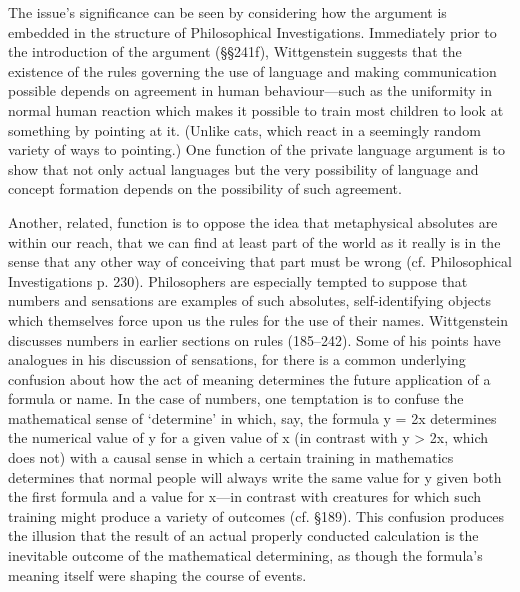   The issue's significance can be seen by considering how the argument is
  embedded in the structure of Philosophical Investigations. Immediately
  prior to the introduction of the argument (§§241f), Wittgenstein suggests
  that the existence of the rules governing the use of language and making
  communication possible depends on agreement in human behaviour—such as the
  uniformity in normal human reaction which makes it possible to train most
  children to look at something by pointing at it. (Unlike cats, which react
  in a seemingly random variety of ways to pointing.) One function of the
  private language argument is to show that not only actual languages but
  the very possibility of language and concept formation depends on the
  possibility of such agreement.

  Another, related, function is to oppose the idea that metaphysical
  absolutes are within our reach, that we can find at least part of the
  world as it really is in the sense that any other way of conceiving that
  part must be wrong (cf. Philosophical Investigations p. 230). Philosophers
  are especially tempted to suppose that numbers and sensations are examples
  of such absolutes, self-identifying objects which themselves force upon us
  the rules for the use of their names. Wittgenstein discusses numbers in
  earlier sections on rules (185–242). Some of his points have analogues in
  his discussion of sensations, for there is a common underlying confusion
  about how the act of meaning determines the future application of a
  formula or name. In the case of numbers, one temptation is to confuse the
  mathematical sense of ‘determine’ in which, say, the formula y = 2x
  determines the numerical value of y for a given value of x (in contrast
  with y > 2x, which does not) with a causal sense in which a certain
  training in mathematics determines that normal people will always write
  the same value for y given both the first formula and a value for x—in
  contrast with creatures for which such training might produce a variety of
  outcomes (cf. §189). This confusion produces the illusion that the result
  of an actual properly conducted calculation is the inevitable outcome of
  the mathematical determining, as though the formula's meaning itself were
  shaping the course of events.


